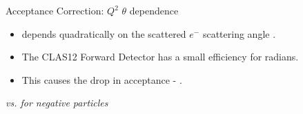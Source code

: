 \begin{frame}{Acceptance Correction: $Q^2$ $\theta$ dependence}
    \label{11.53::q2_theta_dependence}

    \begin{itemize}
        \item
             depends quadratically on the scattered $e^-$ scattering angle .

        \item
            The CLAS12 Forward Detector has a small efficiency for  radians.

        \item
            This causes the drop in acceptance - .
    \end{itemize}

    \begin{center}
        \begin{figure}[t]
        \end{figure}
        \scriptsize{\textit{\ef{$\varphi$} vs. \ef{$\theta$} for negative particles}}
    \end{center}
\end{frame}

